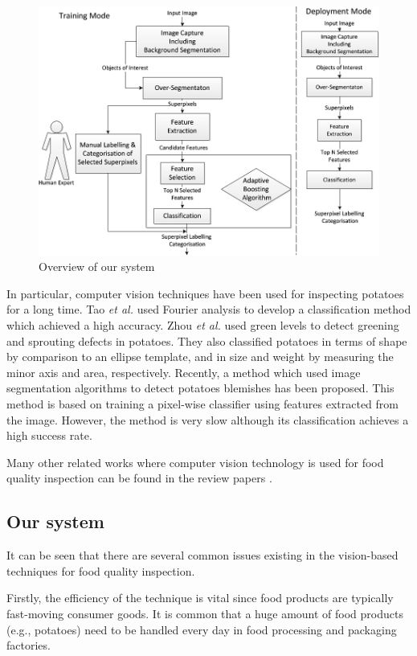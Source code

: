 \documentclass[twocolumn]{svjour3}          %
\begin{document}
\begin{figure}[t]
\centering
\includegraphics[width=0.9\linewidth]{overview.jpg}
\caption{Overview of our system}
\label{fig:ov}
\end{figure} 

In particular, computer vision techniques have been used for inspecting potatoes for a long time. Tao \emph{et al.} \cite{TY95} used Fourier analysis to develop a classification method which achieved a high accuracy. Zhou \emph{et al.} \cite{ZL98} used green levels to detect greening and sprouting defects in potatoes. They also classified potatoes in terms of shape by comparison to an ellipse template, and in size and weight by measuring the minor axis and area, respectively. Recently, a method \cite{BM10} which used image segmentation algorithms to detect potatoes blemishes has been proposed. This method is based on training a pixel-wise classifier using features extracted from the image. However, the method is very slow although its classification achieves a high success rate. 

Many other related works where computer vision technology is used for food quality inspection can be found in the review papers \cite{GS96,BT04,ZC06,WD13,JP13}. 

\subsection{Our system}
It can be seen that there are several common issues existing in the vision-based techniques for food quality inspection. 

Firstly, the efficiency of the technique is vital since food products are typically fast-moving consumer goods. It is common that a huge amount of food products (e.g., potatoes) need to be handled every day in food processing and packaging factories. 
\end{document}
